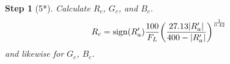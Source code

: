 \documentclass[twocolumn]{scrartcl}
\theoremstyle{named}
\newtheorem*{step}{Step}
\DeclarePairedDelimiter\abs{\lvert}{\rvert}%
\DeclareMathOperator{\sign}{sign}
\begin{document}
\begin{step}[5*]
Calculate $R_c$, $G_c$, and $B_c$.
\[
  R_c = \sign(R'_a) \frac{100}{F_L} {\left(
    \frac{27.13 \abs{R'_a}}{400 - \abs{R'_a}}
    \right)}^{\frac{1}{0.42}}
\]
and likewise for $G_c$, $B_c$.
\end{step}




%
%
%
%
%
%
%

\printbibliography
\end{document}
